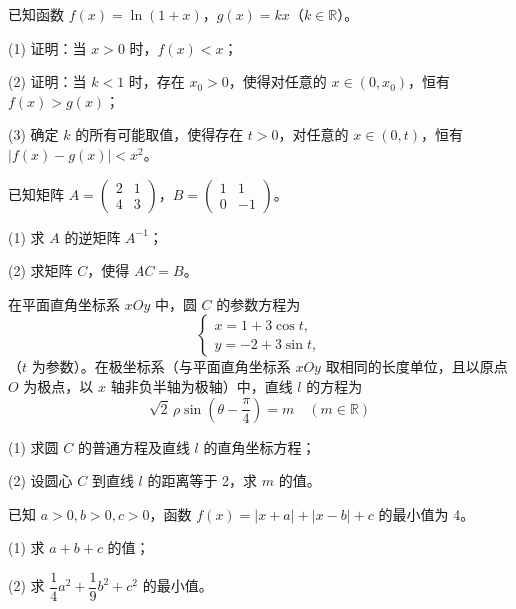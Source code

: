 \begin{question}
已知函数 $f(x)=\ln(1+x)$，$g(x)=kx$（$k\in\mathbb{R}$）。

(1) 证明：当 $x>0$ 时，$f(x)<x$；

(2) 证明：当 $k<1$ 时，存在 $x_0>0$，使得对任意的 $x\in(0,x_0)$，恒有 $f(x)>g(x)$；

(3) 确定 $k$ 的所有可能取值，使得存在 $t>0$，对任意的 $x\in(0,t)$，恒有 $|f(x)-g(x)|<x^2$。

\end{question}
\begin{question}
已知矩阵 $A=\begin{pmatrix}2&1\\4&3\end{pmatrix}$，$B=\begin{pmatrix}1&1\\0&-1\end{pmatrix}$。

(1) 求 $A$ 的逆矩阵 $A^{-1}$；

(2) 求矩阵 $C$，使得 $AC=B$。

\end{question}
\begin{question}
在平面直角坐标系 $xOy$ 中，圆 $C$ 的参数方程为
\nopagebreak[4]
\[
\begin{cases}
x=1+3\cos t,\\
y=-2+3\sin t,
\end{cases}
\]
（$t$ 为参数）。在极坐标系（与平面直角坐标系 $xOy$ 取相同的长度单位，且以原点 $O$ 为极点，以 $x$ 轴非负半轴为极轴）中，直线 $l$ 的方程为
\nopagebreak[4]
\[
\sqrt2\,\rho\sin\!\left(\theta-\dfrac\pi4\right)=m\quad(m\in\mathbb{R})
\]

(1) 求圆 $C$ 的普通方程及直线 $l$ 的直角坐标方程；

(2) 设圆心 $C$ 到直线 $l$ 的距离等于 2，求 $m$ 的值。

\end{question}
\begin{question}
已知 $a>0,b>0,c>0$，函数 $f(x)=|x+a|+|x-b|+c$ 的最小值为 4。

(1) 求 $a+b+c$ 的值；

(2) 求 $\dfrac14a^2+\dfrac19b^2+c^2$ 的最小值。

\end{question}